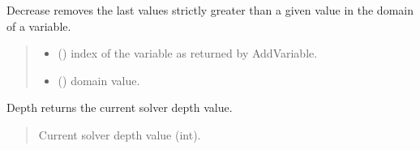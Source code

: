 \documentclass[letterpaper,10pt,openany,oneside,english]{sphinxmanual}
\begin{document}
\begin{fulllineitems}
\begin{fulllineitems}
\begin{quote}
\begin{description}
\end{description}\end{quote}

\end{fulllineitems}


\begin{fulllineitems}
\label{\detokenize{ref/ref_python:pytoulbar2.CFN.Decrease}}
\pysigstartsignatures
{}
\pysigstopsignatures
\sphinxAtStartPar
Decrease removes the last values strictly greater than a given value in the domain of a variable.
\begin{quote}\begin{description}
\begin{itemize}
\item {} 
\sphinxAtStartPar
{} () \textendash{} index of the variable as returned by AddVariable.

\item {} 
\sphinxAtStartPar
{} () \textendash{} domain value.

\end{itemize}

\end{description}\end{quote}

\end{fulllineitems}


\begin{fulllineitems}
\label{\detokenize{ref/ref_python:pytoulbar2.CFN.Depth}}
\pysigstartsignatures
{}
\pysigstopsignatures
\sphinxAtStartPar
Depth returns the current solver depth value.
\begin{quote}\begin{description}
\sphinxAtStartPar
Current solver depth value (int).

\end{description}\end{quote}


\end{fulllineitems}
\end{fulllineitems}
\end{document}
